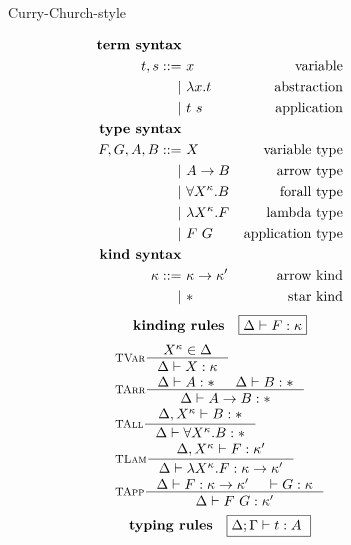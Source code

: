 \begin{figure}
\begin{singlespace}
\begin{minipage}{.46\textwidth}
	\begin{center}Curry-Church-style\end{center}
\def\baselinestretch{0}
\small
\begin{align*}
\textbf{term syntax} \\
t,s ::= &~ x           & \text{variable}    \\
      | &~ \lambda x    . t & \text{abstraction} \\
      | &~ t ~ s       & \text{application} \\
\textbf{type syntax} \\
F,G,A,B ::= &~ X                  & \text{variable type}    \\
          | &~ A -> B             & \text{arrow type}       \\   
          | &~ \forall X^\kappa.B & \text{forall type}      \\
          | &~ \lambda X^\kappa.F      & \text{lambda type}      \\
          | &~ F ~ G              & \text{application type} \\
\textbf{kind syntax} \\
\kappa ::= &~ \kappa -> \kappa' & \text{arrow kind} \\
         | &~ *                 & \text{star kind}   \\
\end{align*}
\[ \textbf{kinding rules} \quad \framebox{$ \Delta |- F:\kappa $} \]\vspace*{-1em}
\begin{align*}
& \inference[\sc TVar]{X^\kappa \in \Delta}{\Delta |- X:\kappa} \\
& \inference[\sc TArr]{\Delta |- A:* & \Delta |- B:*}{\Delta |- A -> B:*} \\
& \inference[\sc TAll]{\Delta,X^\kappa |- B:*}{\Delta |- \forall X^\kappa.B:*} \\
& \inference[\sc TLam]{\Delta,X^\kappa |- F:\kappa'}
		      {\Delta |- \l X^\kappa.F:\kappa -> \kappa'} \\
& \inference[\sc TApp]{\Delta |- F : \kappa -> \kappa' & |- G : \kappa}
		      {\Delta |- F ~ G : \kappa'} \\
\end{align*}
\[ \textbf{typing rules} \quad \framebox{$ \Delta;\Gamma |- t : A $ } \]
\vspace*{-1em}

\end{minipage}
\end{singlespace}
\end{figure}
